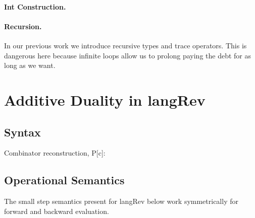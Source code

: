 \documentclass[preprint]{sigplanconf}
\begin{document}
\paragraph*{Int Construction.}

\paragraph*{Recursion.} In our previous work we introduce recursive types and
trace operators. This is dangerous here because infinite loops allow us to
prolong paying the debt for as long as we want.

\section{Additive Duality in {{langRev}} }

\subsection{Syntax}

%
%
%

Combinator reconstruction, {{P[c]}}: 

\subsection{Operational Semantics}

The small step semantics present for {{langRev}} below work
symmetrically for forward and backward evaluation.
\end{document}
